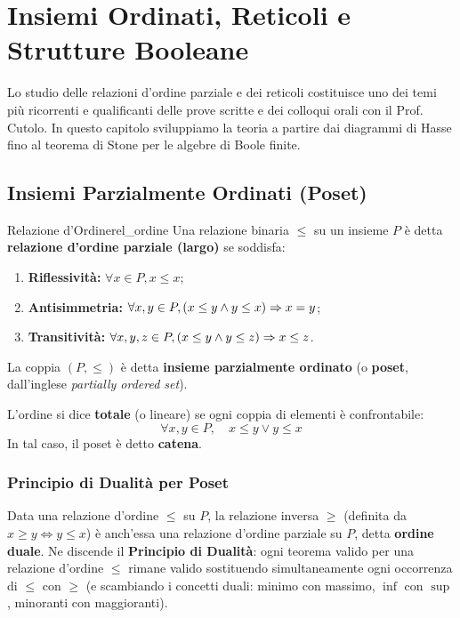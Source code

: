 \chapter{Insiemi Ordinati, Reticoli e Strutture Booleane}
\label{chap:ordini_reticoli}

Lo studio delle relazioni d'ordine parziale e dei reticoli costituisce uno dei temi più ricorrenti e qualificanti delle prove scritte e dei colloqui orali con il Prof. Cutolo. In questo capitolo sviluppiamo la teoria a partire dai diagrammi di Hasse fino al teorema di Stone per le algebre di Boole finite.

\section{Insiemi Parzialmente Ordinati (Poset)}

\begin{definizione}{Relazione d'Ordine}{rel_ordine}
Una relazione binaria $\le$ su un insieme $P$ è detta \textbf{relazione d'ordine parziale (largo)} se soddisfa:
\begin{enumerate}
    \item \textbf{Riflessività:} $\forall x \in P, x \le x$;
    \item \textbf{Antisimmetria:} $\forall x, y \in P, (x \le y \wedge y \le x) \Rightarrow x = y$;
    \item \textbf{Transitività:} $\forall x, y, z \in P, (x \le y \wedge y \le z) \Rightarrow x \le z$.
\end{enumerate}
La coppia $(P, \le)$ è detta \textbf{insieme parzialmente ordinato} (o \textbf{poset}, dall'inglese \emph{partially ordered set}).

L'ordine si dice \textbf{totale} (o lineare) se ogni coppia di elementi è confrontabile:
\[
    \forall x, y \in P, \quad x \le y \vee y \le x
\]
In tal caso, il poset è detto \textbf{catena}.
\end{definizione}

\subsection{Principio di Dualità per Poset}
Data una relazione d'ordine $\le$ su $P$, la relazione inversa $\ge$ (definita da $x \ge y \iff y \le x$) è anch'essa una relazione d'ordine parziale su $P$, detta \textbf{ordine duale}.
Ne discende il \textbf{Principio di Dualità}: ogni teorema valido per una relazione d'ordine $\le$ rimane valido sostituendo simultaneamente ogni occorrenza di $\le$ con $\ge$ (e scambiando i concetti duali: minimo con massimo, $\inf$ con $\sup$, minoranti con maggioranti).

